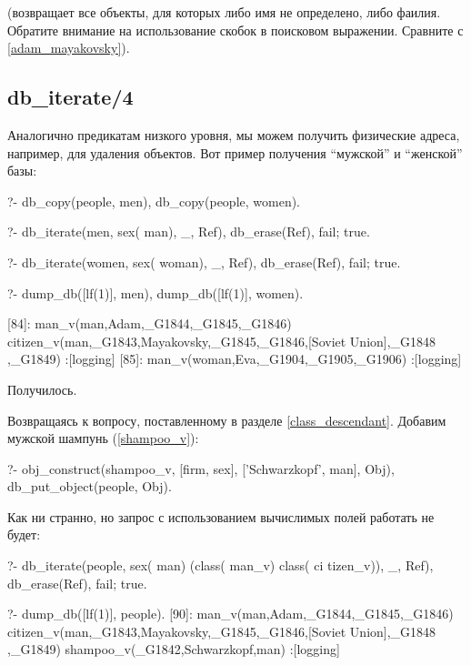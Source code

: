 \documentclass[a4paper]{book}
\begin{document}
(возвращает все объекты, для которых либо имя не определено, либо
фаилия. Обратите внимание на использование скобок в поисковом
выражении. Сравните с \ref{adam_mayakovsky}).

\subsection{db\_iterate/4}

Аналогично предикатам низкого уровня, мы можем получить
физические адреса, например, для удаления объектов. Вот пример
получения ``мужской'' и ``женской'' базы:

\begin{example}{}{}
?- db_copy(people, men), db_copy(people, women).

?- db_iterate(men, sex(\+ man), _, Ref), %
   db_erase(Ref), fail; true.

?- db_iterate(women, sex(\+ woman), _, Ref), %
   db_erase(Ref), fail; true.

?- dump_db([lf(1)], men), dump_db([lf(1)], women).

[84]: man_v(man,Adam,_G1844,_G1845,_G1846) 
citizen_v(man,_G1843,Mayakovsky,_G1845,_G1846,[Soviet Union],_G1848
,_G1849)                                                          
 :[logging]
[85]: man_v(woman,Eva,_G1904,_G1905,_G1906) 
 :[logging]
\end{example}

Получилось.

Возвращаясь к вопросу, поставленному в разделе
\ref{class_descendant}. Добавим мужской шампунь (\ref{shampoo_v}):

\begin{example}{}{}
?- obj_construct(shampoo_v, [firm, sex], 
                 ['Schwarzkopf', man], Obj),
    db_put_object(people, Obj).
\end{example}

Как ни странно, но запрос с использованием вычислимых полей
работать не будет:

\begin{example}{}{}
?- db_iterate(people, sex(\+ man) \/ (class(\+ man_v) \/ class(\+ ci tizen_v)), _, Ref), 
   db_erase(Ref), fail; true.                    

?- dump_db([lf(1)], people).
[90]: man_v(man,Adam,_G1844,_G1845,_G1846) 
citizen_v(man,_G1843,Mayakovsky,_G1845,_G1846,[Soviet Union],_G1848
,_G1849)                                                          
shampoo_v(_G1842,Schwarzkopf,man) 
 :[logging]
\end{example}
\end{document}
